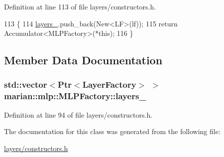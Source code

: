 Definition at line 113 of file layers/constructors.\+h.


\begin{DoxyCode}
113                                                   \{
114     \hyperlink{classmarian_1_1mlp_1_1MLPFactory_ace88ce2ce8efd26a24418119cc7bc5eb}{layers\_}.push\_back(New<LF>(lf));
115     \textcolor{keywordflow}{return} Accumulator<MLPFactory>(*this);
116   \}
\end{DoxyCode}


\subsection{Member Data Documentation}
\subsubsection[{\texorpdfstring{layers\+\_\+}{layers_}}]{\setlength{\rightskip}{0pt plus 5cm}std\+::vector$<${\bf Ptr}$<${\bf Layer\+Factory}$>$ $>$ marian\+::mlp\+::\+M\+L\+P\+Factory\+::layers\+\_\+\hspace{0.3cm}{\ttfamily [private]}}\hypertarget{classmarian_1_1mlp_1_1MLPFactory_ace88ce2ce8efd26a24418119cc7bc5eb}{}\label{classmarian_1_1mlp_1_1MLPFactory_ace88ce2ce8efd26a24418119cc7bc5eb}


Definition at line 94 of file layers/constructors.\+h.



The documentation for this class was generated from the following file\+:\begin{DoxyCompactItemize}
\item 
\hyperlink{layers_2constructors_8h}{layers/constructors.\+h}\end{DoxyCompactItemize}
